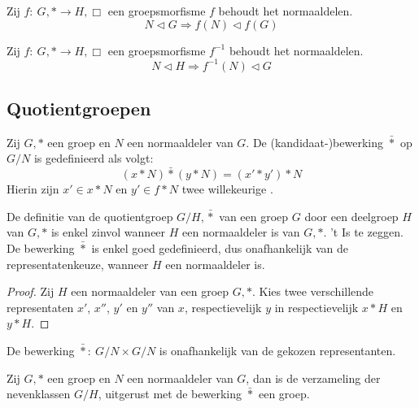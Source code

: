 \documentclass[main.tex]{subfiles}
\begin{document}
\begin{ei}
  Zij $f:\ G,* \rightarrow H,\Box$ een groepsmorfisme
  $f$ behoudt het normaaldelen.
  \[ N \triangleleft G \Rightarrow f(N) \triangleleft f(G) \]
  
\end{ei}

\begin{ei}
  Zij $f:\ G,* \rightarrow H,\Box$ een groepsmorfisme
  $f^{-1}$ behoudt het normaaldelen.
  \[ N \triangleleft H \Rightarrow f^{-1}(N) \triangleleft G \]
  
\end{ei}

\subsection{Quotientgroepen}
\label{sec:quotientgroepen}

\begin{de}
  Zij $G,*$ een groep en $N$ een normaaldeler van $G$.
  De (kandidaat-)bewerking $\bar{*}$ op $G/N$ is gedefinieerd als volgt:
  \[ (x*N)\bar{*}(y*N) = (x'*y')*N \]
  Hierin zijn $x'\in x*N$ en $y'\in f*N$ twee willekeurige .
\end{de}

\begin{st}
  De definitie van de quotientgroep $G/H,\bar{*}$ van een groep $G$ door een deelgroep $H$ van $G,*$ is enkel zinvol wanneer $H$ een normaaldeler is van $G,*$.
  't Is te zeggen. De bewerking $\bar{*}$ is enkel goed gedefinieerd, dus onafhankelijk van de representatenkeuze, wanneer $H$ een normaaldeler is.
  
  \begin{proof}
    Zij $H$ een normaaldeler van een groep $G,*$.
    Kies twee verschillende representaten $x'$, $x''$, $y'$ en $y''$ van $x$, respectievelijk $y$ in respectievelijk $x*H$ en $y*H$.

  \end{proof}
\end{st}

\begin{pr}
  De bewerking $\bar{*}:\ G/N \times G/N$ is onafhankelijk van de gekozen representanten.
  
\end{pr}

\begin{st}
  Zij $G,*$ een groep en $N$ een normaaldeler van $G$, dan is de verzameling der nevenklassen $G/H$, uitgerust met de bewerking $\bar{*}$ een groep.
  
\end{st}
\end{document}
